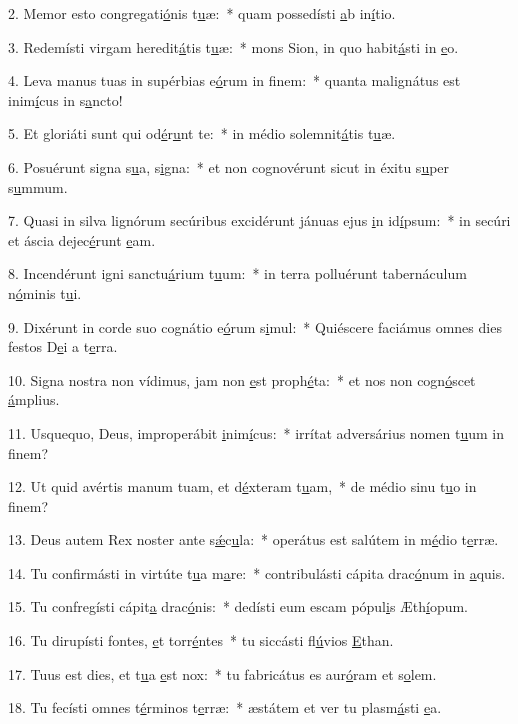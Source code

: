 2. Memor esto congregati\uline{ó}nis t\uline{u}æ:~* quam possedísti \uline{a}b in\uline{í}tio.\par 
3. Redemísti virgam heredit\uline{á}tis t\uline{u}æ:~* mons Sion, in quo habit\uline{á}sti in \uline{e}o.\par 
4. Leva manus tuas in supérbias e\uline{ó}rum in f\uline{i}nem:~* quanta malignátus est inim\uline{í}cus in s\uline{a}ncto!\par 
5. Et gloriáti sunt qui od\uline{é}r\uline{u}nt te:~* in médio solemnit\uline{á}tis t\uline{u}æ.\par 
6. Posuérunt signa s\uline{u}a, s\uline{i}gna:~* et non cognovérunt sicut in éxitu s\uline{u}per s\uline{u}mmum.\par 
7. Quasi in silva lignórum secúribus excidérunt jánuas ejus \uline{i}n id\uline{í}psum:~* in secúri et áscia dejec\uline{é}runt \uline{e}am.\par 
8. Incendérunt igni sanctu\uline{á}rium t\uline{u}um:~* in terra polluérunt tabernáculum n\uline{ó}minis t\uline{u}i.\par 
9. Dixérunt in corde suo cognátio e\uline{ó}rum s\uline{i}mul:~* Quiéscere faciámus omnes dies festos D\uline{e}i a t\uline{e}rra.\par 
10. Signa nostra non vídimus, jam non \uline{e}st proph\uline{é}ta:~* et nos non cogn\uline{ó}scet \uline{á}mplius.\par 
11. Usquequo, Deus, improperábit \uline{i}nim\uline{í}cus:~* irrítat adversárius nomen t\uline{u}um in f\uline{i}nem?\par 
12. Ut quid avértis manum tuam, et d\uline{é}xteram t\uline{u}am,~* de médio sinu t\uline{u}o in f\uline{i}nem?\par 
13. Deus autem Rex noster ante s\uline{ǽ}c\uline{u}la:~* operátus est salútem in m\uline{é}dio t\uline{e}rræ.\par 
14. Tu confirmásti in virtúte t\uline{u}a m\uline{a}re:~* contribulásti cápita drac\uline{ó}num in \uline{a}quis.\par 
15. Tu confregísti cápit\uline{a} drac\uline{ó}nis:~* dedísti eum escam pópul\uline{i}s Æth\uline{í}opum.\par 
16. Tu dirupísti fontes, \uline{e}t torr\uline{é}ntes~* tu siccásti fl\uline{ú}vios \uline{E}than.\par 
17. Tuus est dies, et t\uline{u}a \uline{e}st nox:~* tu fabricátus es aur\uline{ó}ram et s\uline{o}lem.\par 
18. Tu fecísti omnes t\uline{é}rminos t\uline{e}rræ:~* æstátem et ver tu plasm\uline{á}sti \uline{e}a.\par 
